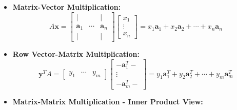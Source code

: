 \documentclass{article}
\begin{document}
\begin{itemize}
    \item \textbf{Matrix-Vector Multiplication:}
    \begin{equation}
        A\mathbf{x} =
        \left[
            \begin{array}{ccc}
                | &        & | \\
                \mathbf{a}_1 & \cdots & \mathbf{a}_n \\
                | &        & |
            \end{array}
        \right]
        \left[
            \begin{array}{c}
                x_1 \\
                \vdots \\
                x_n
            \end{array}
        \right]
        =
        x_1\mathbf{a}_1 + x_2\mathbf{a}_2 + \cdots + x_n\mathbf{a}_n
        \label{eq:matvec}
    \end{equation}

    \item \textbf{Row Vector-Matrix Multiplication:}
    \begin{equation}
        \mathbf{y}^T A =
        \left[
            \begin{array}{ccc}
                y_1 & \cdots & y_m
            \end{array}
        \right]
        \left[
            \begin{array}{c}
                - \mathbf{a}_1^T - \\
                \vdots \\
                - \mathbf{a}_m^T -
            \end{array}
        \right]
        =
        y_1\mathbf{a}_1^T + y_2\mathbf{a}_2^T + \cdots + y_m\mathbf{a}_m^T
        \label{eq:rowvecmat}
    \end{equation}

    \item \textbf{Matrix-Matrix Multiplication - Inner Product View:}


\end{itemize}
\end{document}
